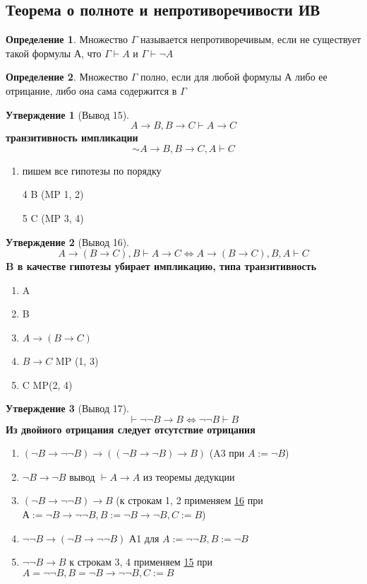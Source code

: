 \documentclass[a4paper]{article}
\theoremstyle{definition}
\newtheorem*{definition}{Определение}
\newtheorem*{statement}{Утверждение}
\theoremstyle{remark}
\begin{document}
    \subsection{Теорема о полноте и непротиворечивости ИВ}
    \begin{definition}
        Множество $\Gamma$ называется непротиворечивым, если не существует
        такой формулы А, что $\Gamma \vdash A$ и $\Gamma \vdash \neg A$
    \end{definition}
    \begin{definition}
        Множество $\Gamma$ полно, если для любой формулы А либо ее отрицание, либо она сама содержится в $\Gamma$
    \end{definition}
    \begin{statement}[\hypertarget{Вывод 15}{Вывод 15}]
        $$A\to B, B\to C\vdash A\to C$$
        \textbf{транзитивность импликации}
        $$\sim A\to B, B\to C, A\vdash C $$
        \begin{enumerate}
            \item пишем все гипотезы по порядку
            \item[4] B (MP 1, 2)
            \item[5] C (MP 3, 4)
        \end{enumerate}
    \end{statement}
    \begin{statement}[\hypertarget{Вывод 16}{Вывод 16}]
        $$A \to (B \to C), B \vdash A \to C \Leftrightarrow A \to (B \to C), B, A \vdash C$$ 
        \textbf{B в качестве гипотезы убирает импликацию, типа транзитивность}
        \begin{enumerate}
            \item A
            \item B
            \item $A \to (B \to C)$
            \item $B \to C$ MP (1, 3)
            \item C MP(2, 4)
        \end{enumerate}
    \end{statement}
    \begin{statement}[\hypertarget{Вывод 17}{Вывод 17}]
        $$\vdash \neg \neg B \to B \Leftrightarrow \neg \neg B\vdash B$$
        \textbf{Из двойного отрицания следует отсутствие отрицания}
        \begin{enumerate}
            \item $(\neg B\to \neg \neg B)\to ((\neg B \to \neg B)\to B)$ (A3 при $A:=\neg B$)
            \item $\neg B \to \neg B$ вывод $\vdash A\to A$ из теоремы дедукции
            \item $(\neg B\to \neg \neg B) \to B$ (к строкам 1, 2 применяем \hyperlink{Вывод 16}{16} при $А:=\neg B \to \neg \neg B, B:=\neg B \to \neg B, C:=B$)
            \item $\neg \neg B \to (\neg B \to \neg \neg B) $ А1 для $A := \neg \neg B, B := \neg B$
            \item $\neg \neg B \to B$ к строкам 3, 4 применяем \hyperlink{Вывод 15}{15} при $A = \neg \neg B, B = \neg B \to \neg \neg B, C :=B$
        \end{enumerate}
    \end{statement}
\end{document}

